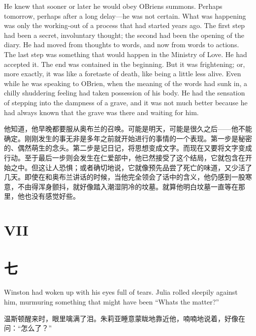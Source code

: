 \begin{paracol}{2}
He knew that sooner or later he would obey
O\textquotesingle Brien\textquotesingle s summons. Perhaps tomorrow,
perhaps after a long delay---he was not certain. What was happening was
only the working-out of a process that had started years ago. The first
step had been a secret, involuntary thought; the second had been the
opening of the diary. He had moved from thoughts to words, and now from
words to actions. The last step was something that would happen in the
Ministry of Love. He had accepted it. The end was contained in the
beginning. But it was frightening; or, more exactly, it was like a
foretaste of death, like being a little less alive. Even while he was
speaking to O\textquotesingle Brien, when the meaning of the words had
sunk in, a chilly shuddering feeling had taken possession of his body.
He had the sensation of stepping into the dampness of a grave, and it
was not much better because he had always known that the grave was there
and waiting for him.

\switchcolumn

他知道，他早晚都要服从奥布兰的召唤。可能是明天，可能是很久之后——他不能确定。刚刚发生的事无非是多年之前就开始进行的事情的一个表现。第一步是秘密的、偶然萌生的念头。第二步是记日记，将思想变成文字。而现在又要将文字变成行动。至于最后一步则会发生在仁爱部中，他已然接受了这个结局，它就包含在开始之中。但这让人恐惧；或者确切地说，它就像预先品尝了死亡的味道，又少活了几天。即使在和奥布兰讲话的时候，当他完全领会了话中的含义，他仍感到一股寒意，不由得浑身颤抖，就好像踏入潮湿阴冷的坟墓。就算他明白坟墓一直等在那里，他也没有感觉好些。

\switchcolumn*


\section{VII}\label{vii-1}

\switchcolumn

\section*{七}\label{ux5341ux4e94}

\switchcolumn*

Winston had woken up with his eyes full of tears. Julia rolled sleepily
against him, murmuring something that might have been
``What\textquotesingle s the matter?''

\switchcolumn

温斯顿醒来时，眼里噙满了泪。朱莉亚睡意蒙眬地靠近他，喃喃地说着，好像在问：``怎么了？''


\end{paracol}
